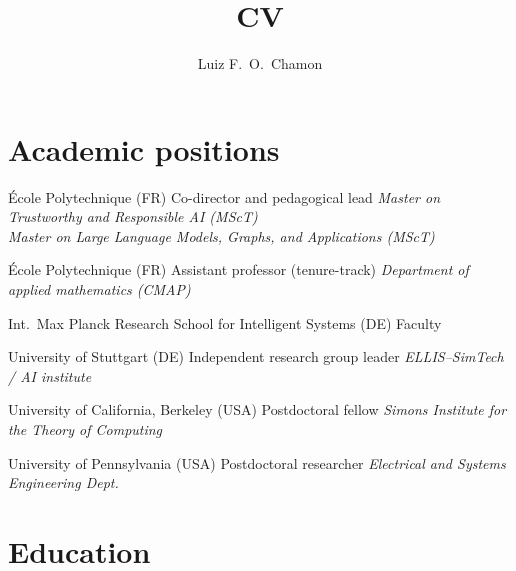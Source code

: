 \documentclass[highlights,publist]{cvlfoc}
\author[Luiz F.\ O.\ Chamon]{Luiz F.\ O.\ Chamon}
\title{CV}
\begin{document}
\maketitle
{}


\vspace{8mm}

\section*{Academic positions}

\begin{entrydate}
		{\'{E}cole Polytechnique (FR)}
		{Co-director and pedagogical lead}
		{\emph{Master on Trustworthy and Responsible AI (MScT)}\\
		\emph{Master on Large Language Models, Graphs, and Applications (MScT)}}

		{\'{E}cole Polytechnique (FR)}
		{Assistant professor (tenure-track)}
		{\emph{Department of applied mathematics (CMAP)}}

		{Int.\ Max Planck Research School for Intelligent Systems (DE)}
		{Faculty}
		{}

		{University of Stuttgart (DE)}
		{Independent research group leader}
		{\emph{ELLIS--SimTech / AI institute}}

		{University of California, Berkeley (USA)}
		{Postdoctoral fellow}
		{\emph{Simons Institute for the Theory of Computing}}

		{University of Pennsylvania (USA)}
		{Postdoctoral researcher}
		{\emph{Electrical and Systems Engineering Dept.}}
\end{entrydate}

\vspace{2mm}


\section*{Education}
\end{document}
